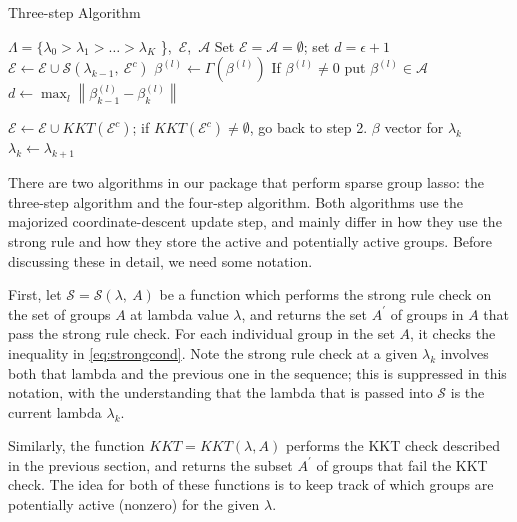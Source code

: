\documentclass[titlepage]{article}
\newcommand{\norm}[1]{\left\lVert #1 \right\rVert}
\begin{document}
\begin{algorithm}
  \caption{Three-step Algorithm\label{alg:threeStep}}
  \begin{algorithmic}
     $\Lambda = \{\lambda_0>\lambda_1> \dots > \lambda_K$ \},\ $\mathcal{E}$,\ $\mathcal{A}$
    \STATE Set $\mathcal{E}=\mathcal{A}=\emptyset$; set $d=\epsilon+1$
     $\mathcal{E} \leftarrow  \mathcal{E}\cup \mathcal{S}(\lambda_{k-1},\ \mathcal{E}^c)$
    \STATE  $\beta^{(l)} \leftarrow \Gamma (\beta^{(l)})$
    \STATE If $\beta^{(l)} \neq 0$ put $\beta^{(l)} \in \mathcal{A}$	
	\ENDFOR
	\STATE $d \leftarrow \max_{l} \norm{\beta^{(l)}_{k-1}-\beta^{(l)}_{k}}$ 
	\ENDWHILE    
    
     $\mathcal{E} \leftarrow  \mathcal{E}\cup KKT(\mathcal{E}^c)$; if $KKT(\mathcal{E}^c) \neq \emptyset$, go back to step 2.  
    \RETURN $\beta$ vector for $\lambda_k$
    \STATE $\lambda_k \leftarrow \lambda_{k+1}$
  \end{algorithmic}
\end{algorithm}


There are two algorithms in our package that perform sparse group lasso: the three-step algorithm and the four-step algorithm. Both algorithms use the majorized coordinate-descent update step, and mainly differ in how they use the strong rule and how they store the active and potentially active groups. Before discussing these in detail, we need some notation.

First, let $\mathcal{S} = \mathcal{S}(\lambda,\ A)$ be a function which performs the strong rule check on the set of groups $A$ at lambda value $\lambda$, and returns the set $A^{\prime}$ of groups in $A$ that pass the strong rule check. For each individual group in the set $A$, it checks the inequality in \autoref{eq:strongcond}. Note the strong rule check at a given $\lambda_k$ involves both that lambda and the previous one in the sequence; this is suppressed in this notation, with the understanding that the lambda that is passed into $\mathcal{S}$ is the current lambda $\lambda_k$.

Similarly, the function $KKT=KKT(\lambda, A)$ performs the KKT check described in the previous section, and returns the subset $A^{\prime}$ of groups that fail the KKT check. The idea for both of these functions is to keep track of which groups are potentially active (nonzero) for the given $\lambda$. 
\end{document}
